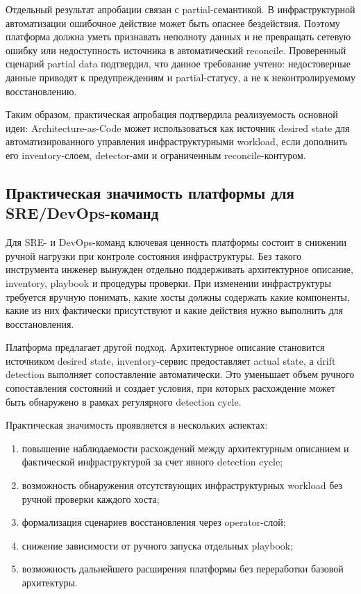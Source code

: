 Отдельный результат апробации связан с partial-семантикой. В инфраструктурной автоматизации ошибочное действие может быть опаснее бездействия. Поэтому платформа должна уметь признавать неполноту данных и не превращать сетевую ошибку или недоступность источника в автоматический reconcile. Проверенный сценарий partial data подтвердил, что данное требование учтено: недостоверные данные приводят к предупреждениям и partial-статусу, а не к неконтролируемому восстановлению.

Таким образом, практическая апробация подтвердила реализуемость основной идеи: Architecture-as-Code может использоваться как источник desired state для автоматизированного управления инфраструктурными workload, если дополнить его inventory-слоем, detector-ами и ограниченным reconcile-контуром.

\subsection{Практическая значимость платформы для SRE/DevOps-команд}

Для SRE- и DevOps-команд ключевая ценность платформы состоит в снижении ручной нагрузки при контроле состояния инфраструктуры. Без такого инструмента инженер вынужден отдельно поддерживать архитектурное описание, inventory, playbook и процедуры проверки. При изменении инфраструктуры требуется вручную понимать, какие хосты должны содержать какие компоненты, какие из них фактически присутствуют и какие действия нужно выполнить для восстановления.

Платформа предлагает другой подход. Архитектурное описание становится источником desired state, inventory-сервис предоставляет actual state, а drift detection выполняет сопоставление автоматически. Это уменьшает объем ручного сопоставления состояний и создает условия, при которых расхождение может быть обнаружено в рамках регулярного detection cycle.

Практическая значимость проявляется в нескольких аспектах:
\begin{enumerate}
    \item повышение наблюдаемости расхождений между архитектурным описанием и фактической инфраструктурой за счет явного detection cycle;
    \item возможность обнаружения отсутствующих инфраструктурных workload без ручной проверки каждого хоста;
    \item формализация сценариев восстановления через operator-слой;
    \item снижение зависимости от ручного запуска отдельных playbook;
    \item возможность дальнейшего расширения платформы без переработки базовой архитектуры.
\end{enumerate}

